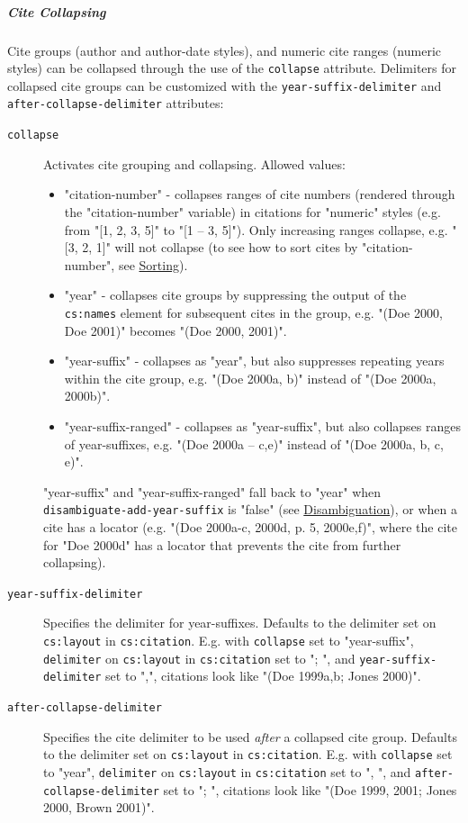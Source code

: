 \hypertarget{cite-collapsing}{%
\subparagraph{Cite Collapsing}\label{cite-collapsing}}

Cite groups (author and author-date styles), and numeric cite ranges
(numeric styles) can be collapsed through the use of the
\texttt{collapse} attribute. Delimiters for collapsed cite groups can be
customized with the \texttt{year-suffix-delimiter} and
\texttt{after-collapse-delimiter} attributes:

\begin{description}
\item[\texttt{collapse}]
Activates cite grouping and collapsing. Allowed values:

\begin{itemize}
\tightlist
\item
  "citation-number" - collapses ranges of cite numbers (rendered through
  the "citation-number" variable) in citations for "numeric" styles
  (e.g. from "{[}1, 2, 3, 5{]}" to "{[}1 -- 3, 5{]}"). Only increasing
  ranges collapse, e.g. "{[}3, 2, 1{]}" will not collapse (to see how to
  sort cites by "citation-number", see
  \protect\hyperlink{sorting}{Sorting}).
\item
  "year" - collapses cite groups by suppressing the output of the
  \texttt{cs:names} element for subsequent cites in the group, e.g.
  "(Doe 2000, Doe 2001)" becomes "(Doe 2000, 2001)".
\item
  "year-suffix" - collapses as "year", but also suppresses repeating
  years within the cite group, e.g. "(Doe 2000a, b)" instead of "(Doe
  2000a, 2000b)".
\item
  "year-suffix-ranged" - collapses as "year-suffix", but also collapses
  ranges of year-suffixes, e.g. "(Doe 2000a -- c,e)" instead of "(Doe
  2000a, b, c, e)".
\end{itemize}

"year-suffix" and "year-suffix-ranged" fall back to "year" when
\texttt{disambiguate-add-year-suffix} is "false" (see
\protect\hyperlink{disambiguation}{Disambiguation}), or when a cite has
a locator (e.g. "(Doe 2000a-c, 2000d, p. 5, 2000e,f)", where the cite
for "Doe 2000d" has a locator that prevents the cite from further
collapsing).
\item[\texttt{year-suffix-delimiter}]
Specifies the delimiter for year-suffixes. Defaults to the delimiter set
on \texttt{cs:layout} in \texttt{cs:citation}. E.g. with
\texttt{collapse} set to "year-suffix", \texttt{delimiter} on
\texttt{cs:layout} in \texttt{cs:citation} set to "; ", and
\texttt{year-suffix-delimiter} set to ",", citations look like "(Doe
1999a,b; Jones 2000)".
\item[\texttt{after-collapse-delimiter}]
Specifies the cite delimiter to be used \emph{after} a collapsed cite
group. Defaults to the delimiter set on \texttt{cs:layout} in
\texttt{cs:citation}. E.g. with \texttt{collapse} set to "year",
\texttt{delimiter} on \texttt{cs:layout} in \texttt{cs:citation} set to
", ", and \texttt{after-collapse-delimiter} set to "; ", citations look
like "(Doe 1999, 2001; Jones 2000, Brown 2001)".
\end{description}

